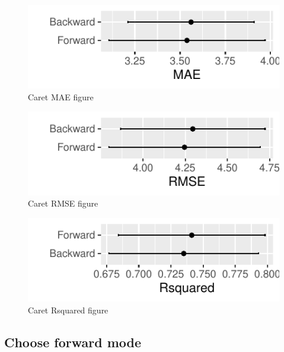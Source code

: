 \documentclass[letterpaper,9pt,twocolumn,twoside,]{pinp}
\begin{document}
\begin{figure}[!h]

{\centering \includegraphics{Report_012E01_files/figure-latex/caret mae-1} 

}

\caption{Caret MAE figure}\label{fig:caret mae}
\end{figure}
\begin{figure}[!h]

{\centering \includegraphics{Report_012E01_files/figure-latex/caret rmse-1} 

}

\caption{Caret RMSE figure}\label{fig:caret rmse}
\end{figure}
\begin{figure}[!h]

{\centering \includegraphics{Report_012E01_files/figure-latex/caret rsq-1} 

}

\caption{Caret Rsquared figure}\label{fig:caret rsq}
\end{figure}

\hypertarget{choose-forward-mode}{%
\subsection{Choose forward mode}\label{choose-forward-mode}}
\end{document}
